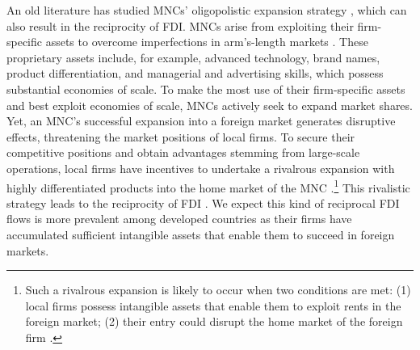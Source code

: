 \documentclass[reqno,onecolumn,letterpaper,12pt]{article}
\begin{document}
An old literature has studied MNCs' oligopolistic expansion strategy \citep{Hymer:1976,Kindleberger:1969}, which can also result in the reciprocity of FDI. MNCs arise from exploiting their firm-specific assets to overcome imperfections in arm's-length markets \citep{Caves:1996,Dunning:1992}. These proprietary assets include, for example, advanced technology, brand names, product differentiation, and managerial and advertising skills, which possess substantial economies of scale. To make the most use of their firm-specific assets and best exploit economies of scale, MNCs actively seek to expand market shares. %
Yet, an MNC's successful expansion into a foreign market %
generates disruptive effects, threatening the market positions of local firms. To secure their competitive positions and obtain advantages stemming from large-scale operations, local firms have incentives to undertake a rivalrous expansion with highly differentiated products into the home market of the MNC \citep{Veugelers:1995}.\footnote{Such a rivalrous expansion is likely to occur when two conditions are met: (1) local firms possess intangible assets that enable them to exploit rents in the foreign market; (2) their entry could disrupt the home market of the foreign firm \citep{Graham:1978}.} This rivalistic strategy leads to the reciprocity of FDI \citep{Graham:1978}. We expect this kind of reciprocal FDI flows is more prevalent among developed countries as their firms have accumulated sufficient intangible assets that enable them to succeed in foreign markets.
\end{document}
